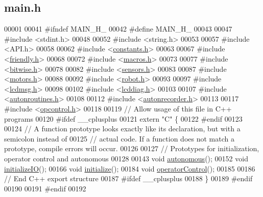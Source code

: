\hypertarget{main_8h_source}{}\subsection{main.\+h}
\label{main_8h_source}

\begin{DoxyCode}
00001 
00041 \textcolor{preprocessor}{#ifndef MAIN\_H\_}
00042 \textcolor{preprocessor}{#define MAIN\_H\_}
00043 
00047 \textcolor{preprocessor}{#include <stdint.h>}
00048 
00052 \textcolor{preprocessor}{#include <string.h>}
00053 
00057 \textcolor{preprocessor}{#include <API.h>}
00058 
00062 \textcolor{preprocessor}{#include <\hyperlink{constants_8h}{constants.h}>}
00063 
00067 \textcolor{preprocessor}{#include <\hyperlink{friendly_8h}{friendly.h}>}
00068 
00072 \textcolor{preprocessor}{#include <\hyperlink{macros_8h}{macros.h}>}
00073 
00077 \textcolor{preprocessor}{#include <\hyperlink{bitwise_8h}{bitwise.h}>}
00078 
00082 \textcolor{preprocessor}{#include <\hyperlink{sensors_8h}{sensors.h}>}
00083 
00087 \textcolor{preprocessor}{#include <\hyperlink{motors_8h}{motors.h}>}
00088 
00092 \textcolor{preprocessor}{#include <\hyperlink{robot_8h}{robot.h}>}
00093 
00097 \textcolor{preprocessor}{#include <\hyperlink{lcdmsg_8h}{lcdmsg.h}>}
00098 
00102 \textcolor{preprocessor}{#include <\hyperlink{lcddiag_8h}{lcddiag.h}>}
00103 
00107 \textcolor{preprocessor}{#include <\hyperlink{autonroutines_8h}{autonroutines.h}>}
00108 
00112 \textcolor{preprocessor}{#include <\hyperlink{autonrecorder_8h}{autonrecorder.h}>}
00113 
00117 \textcolor{preprocessor}{#include <\hyperlink{opcontrol_8h}{opcontrol.h}>}
00118 
00119 \textcolor{comment}{// Allow usage of this file in C++ programs}
00120 \textcolor{preprocessor}{#ifdef \_\_cplusplus}
00121 \textcolor{keyword}{extern} \textcolor{stringliteral}{"C"} \{
00122 \textcolor{preprocessor}{#endif}
00123 
00124 \textcolor{comment}{// A function prototype looks exactly like its declaration, but with a semicolon instead of}
00125 \textcolor{comment}{// actual code. If a function does not match a prototype, compile errors will occur.}
00126 
00127 \textcolor{comment}{// Prototypes for initialization, operator control and autonomous}
00128 
00143 \textcolor{keywordtype}{void} \hyperlink{main_8h_a3c7ca506bbc071fa740de13805b7f376}{autonomous}();
00152 \textcolor{keywordtype}{void} \hyperlink{main_8h_ad9cda921edb01125bb13c2f86bcf624b}{initializeIO}();
00166 \textcolor{keywordtype}{void} \hyperlink{main_8h_a25a40b6614565f755233080a384c35f1}{initialize}();
00184 \textcolor{keywordtype}{void} \hyperlink{main_8h_ac71a94af413917f27d108e95c4d6f6a7}{operatorControl}();
00185 
00186 \textcolor{comment}{// End C++ export structure}
00187 \textcolor{preprocessor}{#ifdef \_\_cplusplus}
00188 \}
00189 \textcolor{preprocessor}{#endif}
00190 
00191 \textcolor{preprocessor}{#endif}
00192 
\end{DoxyCode}
